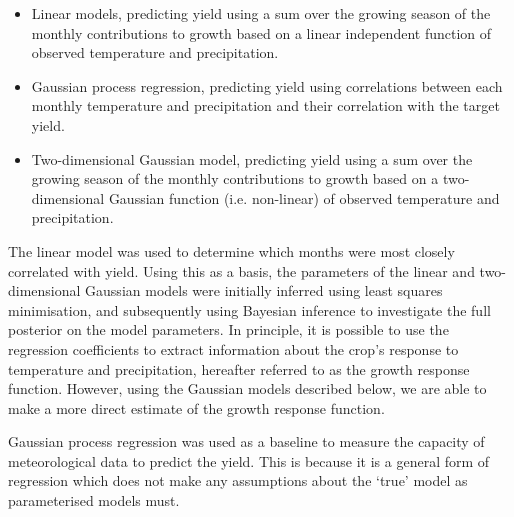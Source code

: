 \documentclass[12pt]{iopart}
\newcommand{\add}[1]{#1}
\begin{document}
\begin{itemize}
\item Linear models, predicting yield \add{using a sum over the growing season of the monthly contributions to growth} based on a linear independent function of observed temperature and precipitation.
\item Gaussian process regression, predicting yield using correlations between each monthly temperature and precipitation and their correlation with the target yield.
\item Two-dimensional Gaussian model, predicting yield \add{using a sum over the growing season of the monthly contributions to growth based on a two-dimensional Gaussian function (i.e. non-linear) of observed temperature and precipitation.}
\end{itemize}

The linear model was used to determine which months were most closely correlated with yield. Using this as a basis, the parameters of the linear and two-dimensional Gaussian models were initially inferred using least squares minimisation, and subsequently using Bayesian inference to investigate the full posterior on the model parameters. In principle, it is possible to use the regression coefficients to extract information about the crop's response to temperature and precipitation, hereafter referred to as the growth response function. However, using the Gaussian models described below, we are able to make a more direct estimate of the growth response function.

Gaussian process regression was used as a baseline to measure the capacity of meteorological data to predict the yield. This is because it is a general form of regression which does not make any assumptions about the `true' model as parameterised models must. 


\end{document}
